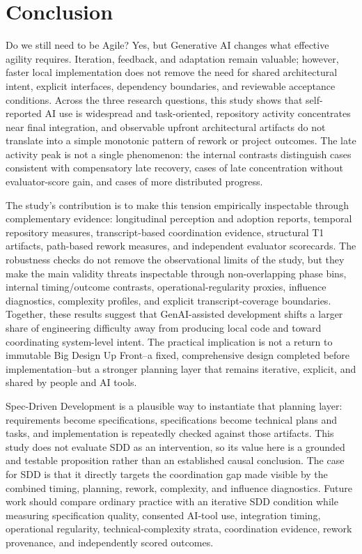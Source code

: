 \section{Conclusion}
Do we still need to be Agile? Yes, but Generative AI changes what effective
agility requires. Iteration, feedback, and adaptation remain valuable; however,
faster local implementation does not remove the need for shared architectural
intent, explicit interfaces, dependency boundaries, and reviewable acceptance
conditions. Across the three research questions, this study shows that
self-reported AI use is widespread and task-oriented, repository activity
concentrates near final integration, and observable upfront architectural
artifacts do not translate into a simple monotonic pattern of rework or
project outcomes. The late activity peak is not a single phenomenon: the
internal contrasts distinguish cases consistent with compensatory late
recovery, cases of late concentration without evaluator-score gain, and cases
of more distributed progress.

The study's contribution is to make this tension empirically inspectable through
complementary evidence: longitudinal perception and adoption reports, temporal
repository measures, transcript-based coordination evidence, structural T1
artifacts, path-based rework measures, and independent evaluator scorecards.
The robustness checks do not remove the observational limits of the study, but
they make the main validity threats inspectable through non-overlapping phase
bins, internal timing/outcome contrasts, operational-regularity proxies,
influence diagnostics, complexity profiles, and explicit transcript-coverage
boundaries. Together, these results suggest that GenAI-assisted development
shifts a larger share of engineering difficulty away from producing local code
and toward coordinating system-level intent. The practical implication is not a
return to immutable Big Design Up Front--a fixed, comprehensive design
completed before implementation--but a stronger planning layer that remains
iterative, explicit, and shared by people and AI tools.

Spec-Driven Development is a plausible way to instantiate that planning layer:
requirements become specifications, specifications become technical plans and
tasks, and implementation is repeatedly checked against those artifacts. This
study does not evaluate SDD as an intervention, so its value here is a grounded
and testable proposition rather than an established causal conclusion. The
case for SDD is that it directly targets the coordination gap made visible by
the combined timing, planning, rework, complexity, and influence diagnostics.
Future work should compare ordinary practice with an iterative SDD condition
while measuring specification quality, consented AI-tool use, integration
timing, operational regularity, technical-complexity strata, coordination
evidence, rework provenance, and independently scored outcomes.

